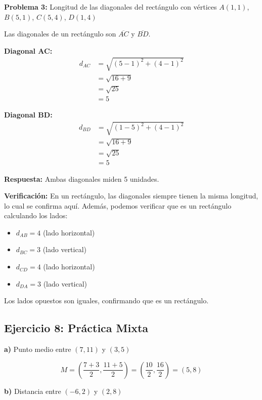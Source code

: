 \medskip

\textbf{Problema 3:} Longitud de las diagonales del rectángulo con vértices $A(1, 1)$, $B(5, 1)$, $C(5, 4)$, $D(1, 4)$

Las diagonales de un rectángulo son $\overline{AC}$ y $\overline{BD}$.

\textbf{Diagonal AC:}
\begin{align*}
d_{AC} &= \sqrt{(5-1)^2 + (4-1)^2} \\
       &= \sqrt{16 + 9} \\
       &= \sqrt{25} \\
       &= 5
\end{align*}

\textbf{Diagonal BD:}
\begin{align*}
d_{BD} &= \sqrt{(1-5)^2 + (4-1)^2} \\
       &= \sqrt{16 + 9} \\
       &= \sqrt{25} \\
       &= 5
\end{align*}

\textbf{Respuesta:} Ambas diagonales miden 5 unidades.

\textbf{Verificación:} En un rectángulo, las diagonales siempre tienen la misma longitud, lo cual se confirma aquí. Además, podemos verificar que es un rectángulo calculando los lados:
\begin{itemize}
    \item $d_{AB} = 4$ (lado horizontal)
    \item $d_{BC} = 3$ (lado vertical)
    \item $d_{CD} = 4$ (lado horizontal)
    \item $d_{DA} = 3$ (lado vertical)
\end{itemize}

Los lados opuestos son iguales, confirmando que es un rectángulo.

\newpage

\subsection*{Ejercicio 8: Práctica Mixta}

\textbf{a)} Punto medio entre $(7, 11)$ y $(3, 5)$

$$M = \left(\frac{7+3}{2}, \frac{11+5}{2}\right) = \left(\frac{10}{2}, \frac{16}{2}\right) = (5, 8)$$

\medskip

\textbf{b)} Distancia entre $(-6, 2)$ y $(2, 8)$

